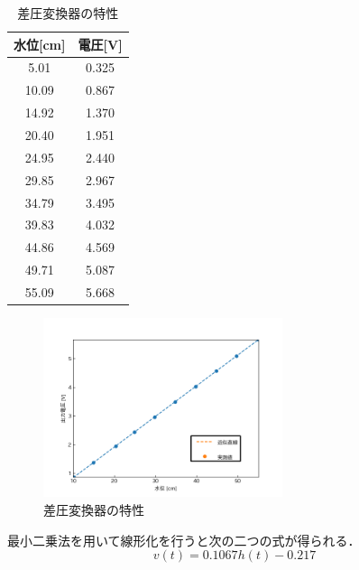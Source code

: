 \documentclass[12pt]{jsarticle}
\begin{document}
\begin{table}[htbp]
  \begin{center}
    \label{Table-H-V}
    \caption{差圧変換器の特性}
    \begin{tabular}{|c|c|} \hline
      水位[cm] & 電圧[V] \\ \hline \hline
       5.01 & 0.325 \\ \hline
      10.09 & 0.867 \\ \hline
      14.92 & 1.370 \\ \hline
      20.40 & 1.951 \\ \hline
      24.95 & 2.440 \\ \hline
      29.85 & 2.967 \\ \hline
      34.79 & 3.495 \\ \hline
      39.83 & 4.032 \\ \hline
      44.86 & 4.569 \\ \hline
      49.71 & 5.087 \\ \hline
      55.09 & 5.668 \\ \hline
    \end{tabular}
  \end{center}
\end{table}
\begin{figure}[tb]
  \begin{center}
    \includegraphics[clip,width=7.0cm]{../graph/approximity_HV.png}
    \caption{差圧変換器の特性}
    \label{Fig-H-V}
  \end{center}
\end{figure}
最小二乗法を用いて線形化を行うと次の二つの式が得られる．
\begin{equation}
  \label{}
  v(t) = 0.1067h(t) - 0.217
\end{equation}
\end{document}
